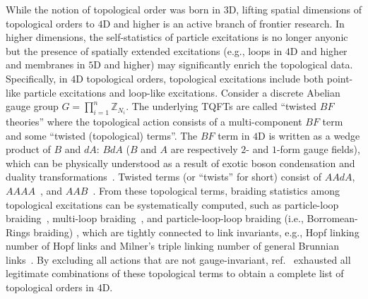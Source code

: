 \documentclass[11pt,nofootinbib,preprint]{revtex4-1}
\begin{document}
 
While the notion of topological order was born in $3$D,  lifting spatial dimensions of topological orders to $4$D and higher is an active branch of frontier research. In higher dimensions, the self-statistics of particle excitations is no longer anyonic~\cite{wu84} but the presence of spatially extended excitations (e.g., loops in $4$D and higher and membranes in $5$D and higher) may significantly enrich the topological data. Specifically, in $4$D topological orders, topological excitations include both  point-like particle excitations and loop-like excitations.  Consider a discrete Abelian gauge group $G=\prod_{i=1}^n{\mathbb{Z} _{N_i}}$. 
The underlying TQFTs are called ``twisted $BF$ theories'' where the topological action consists of  a multi-component $BF$ term \cite{Horowitz1990,hansson2004superconductors}  and some ``twisted (topological) terms''. The $BF$ term in $4$D is written as a wedge product of $B$ and $dA$: $BdA$  ($B$ and $A$ are respectively $2$- and $1$-form gauge fields), which can be physically understood as a result of exotic boson condensation and duality  transformations~\cite{hansson2004superconductors,YW13a,ye16a,Moy_Fradkin2023}. Twisted terms (or ``twists'' for short) consist of  $AAdA$, $AAAA$~\cite{2016arXiv161209298P,PhysRevB.99.235137,YeGu2015,ypdw}, and $AAB$~\cite{yp18prl}.  From these topological terms, braiding statistics among topological excitations  can be systematically computed, such as 
   particle-loop braiding~\cite{hansson2004superconductors,abeffect,PRESKILL199050,PhysRevLett.62.1071,PhysRevLett.62.1221,ALFORD1992251}, multi-loop braiding~\cite{wang_levin1}, and particle-loop-loop braiding (i.e., Borromean-Rings braiding) \cite{yp18prl}, which are tightly connected to link invariants, e.g., Hopf linking number of Hopf links and Milner's triple linking number of general Brunnian links~\cite{kauffman2006formal,mellor2003geometric}.  By excluding all actions that are not gauge-invariant, ref.~\cite{zhang2021compatible} exhausted all legitimate combinations of these topological terms to obtain a complete list of topological orders in $4$D.  
   
\end{document}
